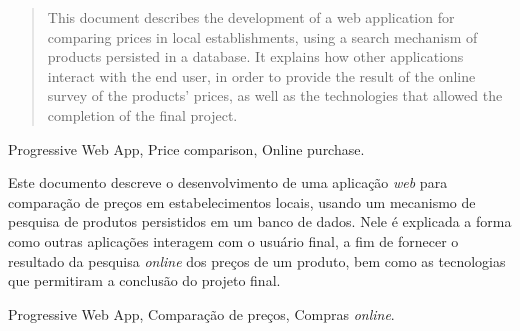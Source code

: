 \begin{abstract}
This document describes the development of a web application for comparing prices in local establishments, using a search mechanism of products persisted in a database. It explains how other applications interact with the end user, in order to provide the result of the online survey of the products' prices, as well as the technologies that allowed the completion of the final project.\end{abstract}
\begin{keywords}
Progressive Web App, Price comparison, Online purchase.
\end{keywords}

\begin{resumo}
Este documento descreve o desenvolvimento de uma aplicação \textit{web} para comparação de preços em estabelecimentos locais, usando um mecanismo de pesquisa de produtos persistidos em um banco de dados. Nele é explicada a forma como outras aplicações interagem com o usuário final, a fim de fornecer o resultado da pesquisa \textit{online} dos preços de um produto, bem como as tecnologias que permitiram a conclusão do projeto final.
\end{resumo}

\begin{palavrasChaves}
Progressive Web App, Comparação de preços, Compras \textit{online}.
\end{palavrasChaves}

